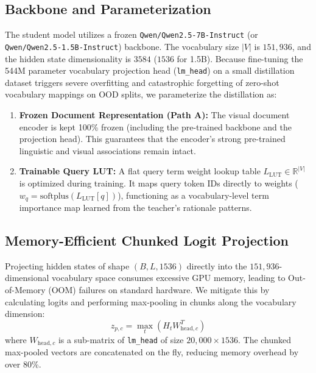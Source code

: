 \documentclass[11pt,a4paper]{article}
\begin{document}
\subsection{Backbone and Parameterization}
The student model utilizes a frozen \texttt{Qwen/Qwen2.5-7B-Instruct} (or \texttt{Qwen/Qwen2.5-1.5B-Instruct}) backbone. The vocabulary size $|V|$ is $151,936$, and the hidden state dimensionality is $3584$ ($1536$ for 1.5B). Because fine-tuning the 544M parameter vocabulary projection head (\texttt{lm\_head}) on a small distillation dataset triggers severe overfitting and catastrophic forgetting of zero-shot vocabulary mappings on OOD splits, we parameterize the distillation as:
\begin{enumerate}
    \item \textbf{Frozen Document Representation (Path A):} The visual document encoder is kept 100\% frozen (including the pre-trained backbone and the projection head). This guarantees that the encoder's strong pre-trained linguistic and visual associations remain intact.
    \item \textbf{Trainable Query LUT:} A flat query term weight lookup table $L_{\text{LUT}} \in \mathbb{R}^{|V|}$ is optimized during training. It maps query token IDs directly to weights ($w_q = \text{softplus}(L_{\text{LUT}}[q])$), functioning as a vocabulary-level term importance map learned from the teacher's rationale patterns.
\end{enumerate}

\subsection{Memory-Efficient Chunked Logit Projection}
Projecting hidden states of shape $(B, L, 1536)$ directly into the $151,936$-dimensional vocabulary space consumes excessive GPU memory, leading to Out-of-Memory (OOM) failures on standard hardware. We mitigate this by calculating logits and performing max-pooling in chunks along the vocabulary dimension:
\begin{equation}
z_{p, c} = \max_{t} \left( H_t W_{\text{head}, c}^T \right)
\end{equation}
where $W_{\text{head}, c}$ is a sub-matrix of \texttt{lm\_head} of size $20,000 \times 1536$. The chunked max-pooled vectors are concatenated on the fly, reducing memory overhead by over 80\%.
\end{document}
